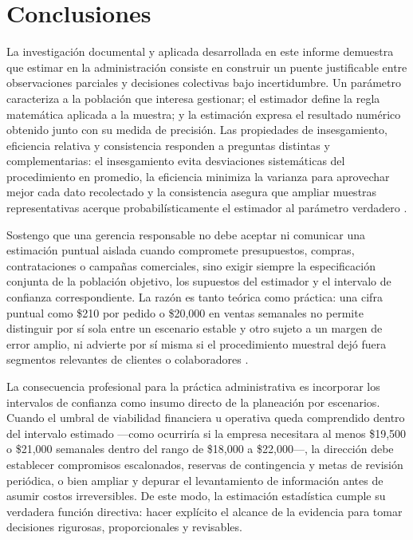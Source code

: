{\clearpage
\section{Conclusiones}
La investigación documental y aplicada desarrollada en este informe demuestra que estimar en la administración consiste en construir un puente justificable entre observaciones parciales y decisiones colectivas bajo incertidumbre. Un parámetro caracteriza a la población que interesa gestionar; el estimador define la regla matemática aplicada a la muestra; y la estimación expresa el resultado numérico obtenido junto con su medida de precisión. Las propiedades de insesgamiento, eficiencia relativa y consistencia responden a preguntas distintas y complementarias: el insesgamiento evita desviaciones sistemáticas del procedimiento en promedio, la eficiencia minimiza la varianza para aprovechar mejor cada dato recolectado y la consistencia asegura que ampliar muestras representativas acerque probabilísticamente el estimador al parámetro verdadero \citep{wackerly2010,holmesBusiness2023}.

Sostengo que una gerencia responsable no debe aceptar ni comunicar una estimación puntual aislada cuando compromete presupuestos, compras, contrataciones o campañas comerciales, sino exigir siempre la especificación conjunta de la población objetivo, los supuestos del estimador y el intervalo de confianza correspondiente. La razón es tanto teórica como práctica: una cifra puntual como \$210 por pedido o \$20,000 en ventas semanales no permite distinguir por sí sola entre un escenario estable y otro sujeto a un margen de error amplio, ni advierte por sí misma si el procedimiento muestral dejó fuera segmentos relevantes de clientes o colaboradores \citep{nistHandbook,bradley2021}.

La consecuencia profesional para la práctica administrativa es incorporar los intervalos de confianza como insumo directo de la planeación por escenarios. Cuando el umbral de viabilidad financiera u operativa queda comprendido dentro del intervalo estimado —como ocurriría si la empresa necesitara al menos \$19,500 o \$21,000 semanales dentro del rango de \$18,000 a \$22,000—, la dirección debe establecer compromisos escalonados, reservas de contingencia y metas de revisión periódica, o bien ampliar y depurar el levantamiento de información antes de asumir costos irreversibles. De este modo, la estimación estadística cumple su verdadera función directiva: hacer explícito el alcance de la evidencia para tomar decisiones rigurosas, proporcionales y revisables.


}
\fi

